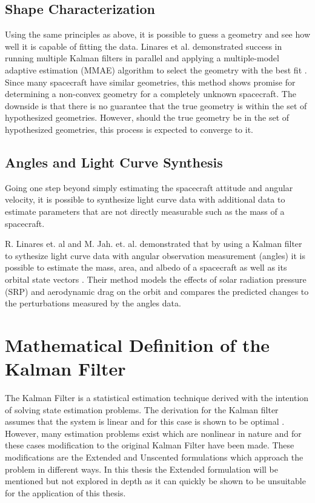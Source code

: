 \subsection{Shape Characterization}

Using the same principles as above, it is possible to guess a geometry and see how well it is capable of fitting the data. Linares et al. demonstrated success in running multiple Kalman filters in parallel and applying a multiple-model adaptive estimation (MMAE) algorithm to select the geometry with the best fit \cite{SpaceObjectCharacterization}. Since many spacecraft have similar geometries, this method shows promise for determining a non-convex geometry for a completely unknown spacecraft. The downside is that there is no guarantee that the true geometry is within the set of hypothesized geometries. However, should the true geometry be in the set of hypothesized geometries, this process is expected to converge to it.

\subsection{Angles and Light Curve Synthesis}

Going one step beyond simply estimating the spacecraft attitude and angular velocity, it is possible to synthesize light curve data with additional data to estimate parameters that are not directly measurable such as the mass of a spacecraft.

R. Linares et. al  and M. Jah. et. al. demonstrated that by using a Kalman filter to sythesize light curve data with angular observation measurement (angles) it is possible to estimate the mass, area, and albedo of a spacecraft as well as its orbital state vectors \cite{Linares_data_fusion} \cite{StateAndParameter}. Their method models the effects of solar radiation pressure (SRP) and aerodynamic drag on the orbit and compares the predicted changes to the perturbations measured by the angles data. 

\section{Mathematical Definition of the Kalman Filter}

The Kalman Filter is a statistical estimation technique derived with the intention of solving state estimation problems. \cite{ukf_merwe} The derivation for the Kalman filter assumes that the system is linear and for this case is shown to be optimal \cite{kf_kalman}. However, many estimation problems exist which are nonlinear in nature and for these cases modification to the original Kalman Filter have been made. These modifications are the Extended and Unscented formulations which approach the problem in different ways. In this thesis the Extended formulation will be mentioned but not explored in depth as it can quickly be shown to be unsuitable for the application of this thesis.

